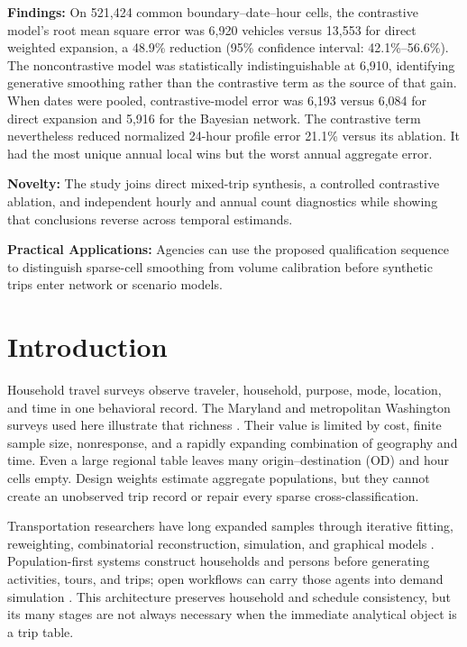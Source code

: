 \documentclass[numbered]{trbunofficial}
\begin{document}
\noindent\textbf{Findings:} On 521,424 common boundary--date--hour cells, the contrastive model's root mean square error was 6,920 vehicles versus 13,553 for direct weighted expansion, a 48.9\% reduction (95\% confidence interval: 42.1\%--56.6\%). The noncontrastive model was statistically indistinguishable at 6,910, identifying generative smoothing rather than the contrastive term as the source of that gain. When dates were pooled, contrastive-model error was 6,193 versus 6,084 for direct expansion and 5,916 for the Bayesian network. The contrastive term nevertheless reduced normalized 24-hour profile error 21.1\% versus its ablation. It had the most unique annual local wins but the worst annual aggregate error.

\noindent\textbf{Novelty:} The study joins direct mixed-trip synthesis, a controlled contrastive ablation, and independent hourly and annual count diagnostics while showing that conclusions reverse across temporal estimands.

\noindent\textbf{Practical Applications:} Agencies can use the proposed qualification sequence to distinguish sparse-cell smoothing from volume calibration before synthetic trips enter network or scenario models.

\newpage

\section{Introduction}

Household travel surveys observe traveler, household, purpose, mode, location, and time in one behavioral record. The Maryland and metropolitan Washington surveys used here illustrate that richness \citep{bmc2020mts,mwcog2019rts}. Their value is limited by cost, finite sample size, nonresponse, and a rapidly expanding combination of geography and time. Even a large regional table leaves many origin--destination (OD) and hour cells empty. Design weights estimate aggregate populations, but they cannot create an unobserved trip record or repair every sparse cross-classification.

Transportation researchers have long expanded samples through iterative fitting, reweighting, combinatorial reconstruction, simulation, and graphical models \citep{beckman1996creating,farooq2013simulation,sun2015bayesian,saadi2016hidden}. Population-first systems construct households and persons before generating activities, tours, and trips; open workflows can carry those agents into demand simulation \citep{horl2021paris}. This architecture preserves household and schedule consistency, but its many stages are not always necessary when the immediate analytical object is a trip table.
\end{document}
